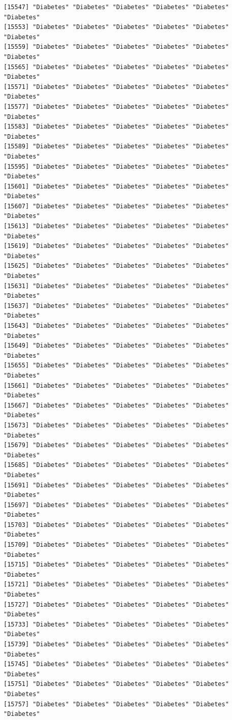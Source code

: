 \documentclass[
  letterpaper,
  DIV=11,
  numbers=noendperiod]{scrartcl}
\begin{document}
\begin{verbatim}
[15547] "Diabetes" "Diabetes" "Diabetes" "Diabetes" "Diabetes" "Diabetes"
[15553] "Diabetes" "Diabetes" "Diabetes" "Diabetes" "Diabetes" "Diabetes"
[15559] "Diabetes" "Diabetes" "Diabetes" "Diabetes" "Diabetes" "Diabetes"
[15565] "Diabetes" "Diabetes" "Diabetes" "Diabetes" "Diabetes" "Diabetes"
[15571] "Diabetes" "Diabetes" "Diabetes" "Diabetes" "Diabetes" "Diabetes"
[15577] "Diabetes" "Diabetes" "Diabetes" "Diabetes" "Diabetes" "Diabetes"
[15583] "Diabetes" "Diabetes" "Diabetes" "Diabetes" "Diabetes" "Diabetes"
[15589] "Diabetes" "Diabetes" "Diabetes" "Diabetes" "Diabetes" "Diabetes"
[15595] "Diabetes" "Diabetes" "Diabetes" "Diabetes" "Diabetes" "Diabetes"
[15601] "Diabetes" "Diabetes" "Diabetes" "Diabetes" "Diabetes" "Diabetes"
[15607] "Diabetes" "Diabetes" "Diabetes" "Diabetes" "Diabetes" "Diabetes"
[15613] "Diabetes" "Diabetes" "Diabetes" "Diabetes" "Diabetes" "Diabetes"
[15619] "Diabetes" "Diabetes" "Diabetes" "Diabetes" "Diabetes" "Diabetes"
[15625] "Diabetes" "Diabetes" "Diabetes" "Diabetes" "Diabetes" "Diabetes"
[15631] "Diabetes" "Diabetes" "Diabetes" "Diabetes" "Diabetes" "Diabetes"
[15637] "Diabetes" "Diabetes" "Diabetes" "Diabetes" "Diabetes" "Diabetes"
[15643] "Diabetes" "Diabetes" "Diabetes" "Diabetes" "Diabetes" "Diabetes"
[15649] "Diabetes" "Diabetes" "Diabetes" "Diabetes" "Diabetes" "Diabetes"
[15655] "Diabetes" "Diabetes" "Diabetes" "Diabetes" "Diabetes" "Diabetes"
[15661] "Diabetes" "Diabetes" "Diabetes" "Diabetes" "Diabetes" "Diabetes"
[15667] "Diabetes" "Diabetes" "Diabetes" "Diabetes" "Diabetes" "Diabetes"
[15673] "Diabetes" "Diabetes" "Diabetes" "Diabetes" "Diabetes" "Diabetes"
[15679] "Diabetes" "Diabetes" "Diabetes" "Diabetes" "Diabetes" "Diabetes"
[15685] "Diabetes" "Diabetes" "Diabetes" "Diabetes" "Diabetes" "Diabetes"
[15691] "Diabetes" "Diabetes" "Diabetes" "Diabetes" "Diabetes" "Diabetes"
[15697] "Diabetes" "Diabetes" "Diabetes" "Diabetes" "Diabetes" "Diabetes"
[15703] "Diabetes" "Diabetes" "Diabetes" "Diabetes" "Diabetes" "Diabetes"
[15709] "Diabetes" "Diabetes" "Diabetes" "Diabetes" "Diabetes" "Diabetes"
[15715] "Diabetes" "Diabetes" "Diabetes" "Diabetes" "Diabetes" "Diabetes"
[15721] "Diabetes" "Diabetes" "Diabetes" "Diabetes" "Diabetes" "Diabetes"
[15727] "Diabetes" "Diabetes" "Diabetes" "Diabetes" "Diabetes" "Diabetes"
[15733] "Diabetes" "Diabetes" "Diabetes" "Diabetes" "Diabetes" "Diabetes"
[15739] "Diabetes" "Diabetes" "Diabetes" "Diabetes" "Diabetes" "Diabetes"
[15745] "Diabetes" "Diabetes" "Diabetes" "Diabetes" "Diabetes" "Diabetes"
[15751] "Diabetes" "Diabetes" "Diabetes" "Diabetes" "Diabetes" "Diabetes"
[15757] "Diabetes" "Diabetes" "Diabetes" "Diabetes" "Diabetes" "Diabetes"

\end{verbatim}
\end{document}
